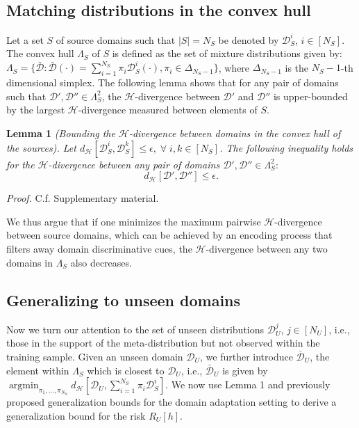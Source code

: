 \documentclass{article}
\DeclareMathOperator*{\argmin}{argmin}
\begin{document}
\subsection{Matching distributions in the convex hull}
Let a set $S$ of source domains such that $|S|=N_S$ be denoted by $\mathcal{D}^i_S$, $i \in [N_S]$. The convex hull $\Lambda_S$ of $S$ is defined as the set of mixture distributions given by: $\Lambda_S = \{\bar{\mathcal{D}}: \bar{\mathcal{D}}(\cdot) = \sum_{i=1}^{N_S} \pi_{i} \mathcal{D}^i_S(\cdot), \pi_{i} \in \Delta_{N_S-1}\}$, where $\Delta_{N_S-1}$ is the $N_S-1$-th dimensional simplex. The following lemma shows that for any pair of domains such that $\mathcal{D}', \mathcal{D}'' \in \Lambda_S^2$, the $\mathcal{H}$-divergence between $\mathcal{D}'$ and $\mathcal{D}''$ is upper-bounded by the largest $\mathcal{H}$-divergence measured between elements of $S$.

\textbf{Lemma 1} \textit{(Bounding the $\mathcal{H}$-divergence between domains in the convex hull of the sources). Let $d_{\mathcal{H}}[\mathcal{D}^i_S, \mathcal{D}^k_S]\leq \epsilon, \; \forall \; i,k \in[N_S]$. The following inequality holds for the $\mathcal{H}$-divergence between any pair of domains $\mathcal{D}', \mathcal{D}'' \in \Lambda_S^2$}:
\begin{equation}
    d_{\mathcal{H}}[\mathcal{D}', \mathcal{D}''] \leq  \epsilon. 
\end{equation}

\textit{Proof.} C.f. Supplementary material. 

We thus argue that if one minimizes the maximum pairwise $\mathcal{H}$-divergence between source domains, which can be achieved by an encoding process that filters away domain discriminative cues, the $\mathcal{H}$-divergence between any two domains in $\Lambda_S$ also decreases. 

\subsection{Generalizing to unseen domains}
Now we turn our attention to the set of unseen distributions $\mathcal{D}^j_U$, $j\in[N_U]$, i.e., those in the support of the meta-distribution but not observed within the training sample. Given an unseen domain $\mathcal{D}_U$, we further introduce $\bar{\mathcal{D}}_U$, the element within $\Lambda_S$ which is closest to  $\mathcal{D}_U$, i.e.,  $\bar{\mathcal{D}}_U$ is given by $\argmin_{\pi_1, \ldots, \pi_{N_S}}d_{\mathcal{H}}\left[\mathcal{D}_U, \sum_{i=1}^{N_S} \pi_{i} \mathcal{D}^i_S\right]$. 
We now use Lemma 1 and previously proposed generalization bounds for the domain adaptation setting \cite{zhao2018adversarial, zhao2019learning} to derive a generalization bound for the risk $R_U[h]$. 
\end{document}
